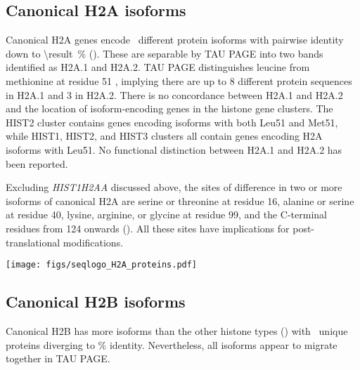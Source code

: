   \subsection{Canonical H2A isoforms}
    Canonical H2A genes encode \HTwoAUniqueProteins{}~different
    protein isoforms with pairwise identity down to
     \SI{\result}{\percent} ().
    These are separable by TAU PAGE into two bands identified as H2A.1 and H2A.2.
    TAU PAGE distinguishes leucine from methionine at residue 51 \citep{FranklinZweidler1977,Zweidler1977},
    implying there are up to 8 different protein sequences in H2A.1 and 3 in H2A.2.
    There is no concordance between H2A.1 and H2A.2
    and the location of isoform-encoding genes in the histone gene clusters.
    The HIST2 cluster contains genes encoding isoforms with both Leu51 and Met51,
    while HIST1, HIST2, and HIST3 clusters all contain genes encoding H2A isoforms with Leu51.
    No functional distinction between H2A.1 and H2A.2 has been reported.

    Excluding \textit{HIST1H2AA} discussed above,
    the sites of difference in two or more isoforms of canonical H2A are
    serine or threonine at residue 16,
    alanine or serine at residue 40,
    lysine, arginine, or glycine at residue 99,
    and the C-terminal residues from 124 onwards ().
    All these sites have implications for post-translational modifications.

    \begin{table}
      \caption{%
        Canonical H2A encoded protein isoforms.
        Upper panel shows isoform variations relative to most common isoform
        using HGVS recommended nomenclature \citep{mutnomenclature2003}.
        Lower panel shows sequence logo of all isoforms aligned
        with invariant residues in grey.
      }
      \label{tab:H2A-consensus}
      
      \texttt{[image: figs/seqlogo\_H2A\_proteins.pdf]}
    \end{table}

  \subsection{Canonical H2B isoforms}
    Canonical H2B has more isoforms than the other histone types ()
    with \HTwoBUniqueProteins{}~unique proteins
    diverging to \result\% identity.
    Nevertheless, all isoforms appear to migrate together in TAU PAGE.


